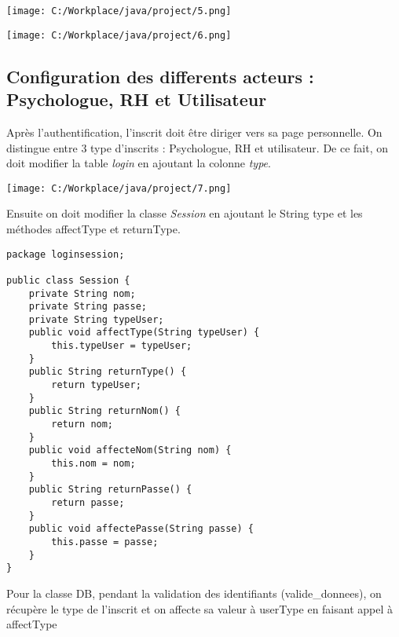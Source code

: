\documentclass[12]{article}
\begin{document}
\begin{center}
\texttt{[image: C:/Workplace/java/project/5.png]}
\end{center}

\begin{center}
\texttt{[image: C:/Workplace/java/project/6.png]}
\end{center}


\subsection{Configuration des differents acteurs : Psychologue, RH et Utilisateur }

Après l'authentification, l'inscrit doit être diriger vers sa page personnelle. On distingue entre 3 type d'inscrits : Psychologue, RH et utilisateur. De ce fait, on doit modifier la table \textit{login} en ajoutant la colonne \textit{type}.\\

\begin{center}
\texttt{[image: C:/Workplace/java/project/7.png]}
\end{center}

\newpage

Ensuite on doit modifier la classe \textit{Session} en ajoutant le String type et les méthodes affectType et returnType.\\

\begin{scriptsize}
\lstset{language=java}
\begin{lstlisting}
package loginsession;

public class Session {
	private String nom;
	private String passe;
	private String typeUser;
	public void affectType(String typeUser) {
		this.typeUser = typeUser;
	}
	public String returnType() {
		return typeUser;
	}
	public String returnNom() {
		return nom;
	}
	public void affecteNom(String nom) {
		this.nom = nom;
	}
	public String returnPasse() {
		return passe;
	}
	public void affectePasse(String passe) {
		this.passe = passe;
	}
}

\end{lstlisting}
\end{scriptsize}

\newpage
Pour la classe DB, pendant la validation des identifiants (valide\_donnees), on récupère le type de l'inscrit et on affecte sa valeur à userType en faisant appel à affectType\\
\end{document}
